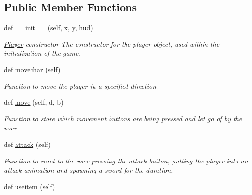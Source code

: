 \subsection*{Public Member Functions}
\begin{DoxyCompactItemize}
\item 
def \hyperlink{classactor_1_1player_1_1_player_ab706da8ac6c2ddecb694069c9c55485b}{\+\_\+\+\_\+init\+\_\+\+\_\+} (self, x, y, hud)
\begin{DoxyCompactList}\small\item\em \hyperlink{classactor_1_1player_1_1_player}{Player} constructor  The constructor for the player object, used within the initialization of the game. \end{DoxyCompactList}\item 
\mbox{\label{classactor_1_1player_1_1_player_a43e8f90a1db2286bfb59f80853dcb336}} 
def \hyperlink{classactor_1_1player_1_1_player_a43e8f90a1db2286bfb59f80853dcb336}{movechar} (self)
\begin{DoxyCompactList}\small\item\em Function to move the player in a specified direction. \end{DoxyCompactList}\item 
def \hyperlink{classactor_1_1player_1_1_player_a8ac11a22aa47b7febd29d1c740f00452}{move} (self, d, b)
\begin{DoxyCompactList}\small\item\em Function to store which movement buttons are being pressed and let go of by the user. \end{DoxyCompactList}\item 
\mbox{\label{classactor_1_1player_1_1_player_a2b481f9bd7f42a0dc98beec777ec5401}} 
def \hyperlink{classactor_1_1player_1_1_player_a2b481f9bd7f42a0dc98beec777ec5401}{attack} (self)
\begin{DoxyCompactList}\small\item\em Function to react to the user pressing the attack button, putting the player into an attack animation and spawning a sword for the duration. \end{DoxyCompactList}\item 
\mbox{\label{classactor_1_1player_1_1_player_aacc64de5a021da2b0cfd9535309617e3}} 
def \hyperlink{classactor_1_1player_1_1_player_aacc64de5a021da2b0cfd9535309617e3}{useitem} (self)

\end{DoxyCompactItemize}
